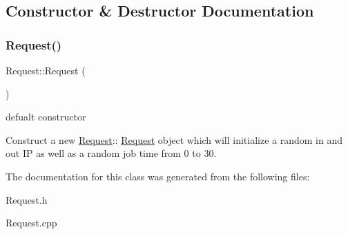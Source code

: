 \subsection{Constructor \& Destructor Documentation}
\mbox{\label{classRequest_afaf8d8928de7ffff8a3767589489bd33}} 
\subsubsection{\texorpdfstring{Request()}{Request()}}
{\footnotesize\ttfamily Request\+::\+Request (\begin{DoxyParamCaption}{ }\end{DoxyParamCaption})}



defualt constructor 

Construct a new \hyperlink{classRequest}{Request}\+:\+: \hyperlink{classRequest}{Request} object which will initialize a random in and out IP as well as a random job time from 0 to 30. 

The documentation for this class was generated from the following files\+:\begin{DoxyCompactItemize}
\item 
Request.\+h\item 
Request.\+cpp\end{DoxyCompactItemize}
